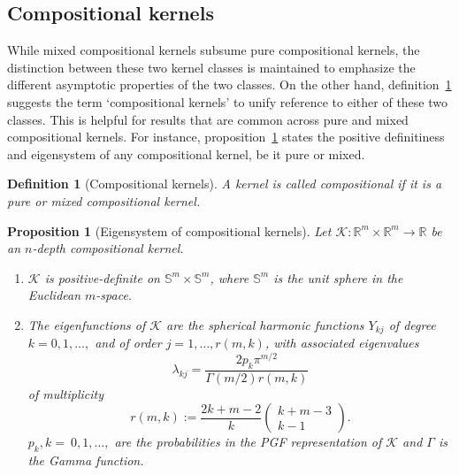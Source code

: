 \documentclass[final, 12pt]{colt2021} %
\newtheorem{dfn}{Definition}
\newtheorem{prop}{Proposition}
\begin{document}

\subsection{Compositional kernels}
\label{sec:compositional_kernels}

While mixed compositional kernels subsume
pure compositional kernels,
the distinction between these two kernel classes is maintained
to emphasize the different asymptotic properties of the two classes.
On the other hand, definition~\ref{dfn:compo_k}
suggests the term `compositional kernels'
to unify reference to either of these two classes.
This is helpful for results
that are common across pure and mixed compositional kernels.
For instance,
proposition~\ref{prop:pure_theta_k_eigensys}
states the positive definitiness and eigensystem
of any compositional kernel, be it pure or mixed.

\begin{dfn}[Compositional kernels]
\label{dfn:compo_k}
A kernel is called compositional
if it is a pure or mixed compositional kernel.
\end{dfn}

\begin{prop}[Eigensystem of compositional kernels]
	\label{prop:pure_theta_k_eigensys}
	Let
	$\mathcal{K}:\mathbb{R}^m\times\mathbb{R}^m\rightarrow\mathbb{R}$
	be an $n$-depth compositional kernel.
	\begin{enumerate}
		\item $\mathcal{K}$ is positive-definite
		on $\mathbb{S}^m\times\mathbb{S}^m$,
		where $\mathbb{S}^m$ is the unit sphere
		in the Euclidean $m$-space.
		\item The eigenfunctions of $\mathcal{K}$ are
		the spherical harmonic functions $Y_{kj}$ of
		degree $k=0,1,\ldots,$ and
		of order $j=1,\ldots,r(m, k)$,
		with associated eigenvalues
		\begin{equation}
		\label{eq:lambda}
		\lambda_{kj}=
		\frac{2p_k\pi^{m/2}}{\Gamma(m/2)r(m, k)}
		\end{equation}
		of multiplicity
		\begin{equation}
		\label{eq:r}
		r(m, k) :=
		\frac{2k+m-2}{k}
		\begin{pmatrix}
		k+m-3\\
		k-1
		\end{pmatrix}.
		\end{equation}
		$p_k,k=~0,1,\ldots,$ are the probabilities in the
		PGF representation of $\mathcal{K}$
		and $\Gamma$ is the Gamma function.
	\end{enumerate}
\end{prop}
\end{document}
